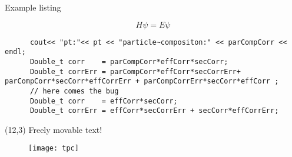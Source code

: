 \begin{frame}[fragile]{Example listing}



	\begin{displaymath}
	H \psi = E \psi
	\end{displaymath}

	\begin{lstlisting}
	  cout<< "pt:"<< pt << "particle~compositon:" << parCompCorr << endl;	  
	  Double_t corr    = parCompCorr*effCorr*secCorr;	  
	  Double_t corrErr = parCompCorr*effCorr*secCorrErr+ parCompCorr*secCorr*effCorrErr + parCompCorrErr*secCorr*effCorr ; 	  
	  // here comes the bug	  
	  Double_t corr    = effCorr*secCorr;	  
	  Double_t corrErr = effCorr*secCorrErr + secCorr*effCorrErr;  
	\end{lstlisting} 
	
	\begin{textblock}{2.5}(12,3)
	{\tiny Freely movable text!}
	\begin{figure}
	\texttt{[image: tpc]}
	\end{figure}
\end{textblock}
\end{frame}	


